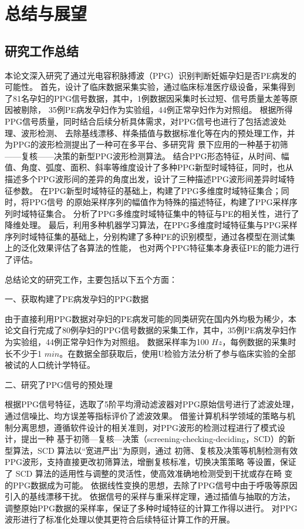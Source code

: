 \chapter{总结与展望}
\section{研究工作总结}
本论文深入研究了通过光电容积脉搏波（PPG）识别判断妊娠孕妇是否PE病发的可能性。
首先，设计了临床数据采集实验，通过临床标准医疗级设备，采集得到了81名孕妇的PPG信号数据，其中，1例数据因采集时长过短、信号质量太差等原因被剔除，
35例PE病发孕妇作为实验组，44例正常孕妇作为对照组。
根据所得PPG信号质量，同时结合后续分析具体需求，对PPG信号也进行了包括滤波处理、波形检测、
去除基线漂移、样条插值与数据标准化等在内的预处理工作，并为PPG的波形检测提出了一种可在多平台、多研究背
景下应用的一种基于初筛——复核——决策的新型PPG波形检测算法。
结合PPG形态特征，从时间、幅值、角度、弧度、面积、斜率等维度设计了多种PPG新型时域特征，同时，也从
描述多个PPG波形间的差异的角度出发，设计了三种描述PPG波形间差异时域特征参数。
在PPG新型时域特征的基础上，构建了PPG多维度时域特征集合；同时，将PPG信号
的原始采样序列的幅值作为特殊的描述特征，构建了PPG采样序列时域特征集合。
分析了PPG多维度时域特征集中的特征与PE的相关性，进行了降维处理。
最后，利用多种机器学习算法，在PPG多维度时域特征集与PPG采样序列时域特征集的基础上，分别构建了多种PE的识别模型，通过各模型在测试集上的泛化效果评估了各算法的性能，
也对两个PPG特征集本身表征PE的能力进行了评估。

总结论文的研究工作，主要包括以下五个方面：

一、获取构建了PE病发孕妇的PPG数据

由于直接利用PPG数据对孕妇的PE病发可能的同类研究在国内外均极为稀少，本论文自行完成了80例孕妇的PPG信号数据的采集工作，其中，35例PE病发孕妇作为实验组，44例正常孕妇作为对照组。
数据采样率为100 $Hz$，每例数据的采集时长不少于1 $min$。在数据全部获取后，使用U检验方法分析了参与临床实验的全部被试的人口统计学特征。

二、研究了PPG信号的预处理

根据PPG信号特征，选取了5阶平均滑动滤波器对PPG原始信号进行了滤波处理，通过信噪比、均方误差等指标评价了滤波效果。
借鉴计算机科学领域的策略与机制分离思想，遵循软件设计的相关准则，对PPG波形的检测过程进行了模式设计，提出一种
基于初筛—复核—决策（screening-checking-deciding，SCD）的新型算法，SCD 算法以“宽进严出”为原则，通过
初筛、复核及决策等机制检测有效PPG波形，支持直接更改初筛算法，增删复核标准，切换决策策略
等设置，保证了 SCD 算法的适用性与调整的灵活性，使高效准确地检测受到干扰或存在畸
变的PPG数据成为可能。
依据线性变换的思想，去除了PPG信号中由于呼吸等原因引入的基线漂移干扰。
依据信号的采样与重采样定理，通过插值与抽取的方法，调整原始PPG数据的采样率，保证了多种时域特征的计算工作得以进行。
对PPG波形进行了标准化处理以使其更符合后续特征计算工作的开展。

